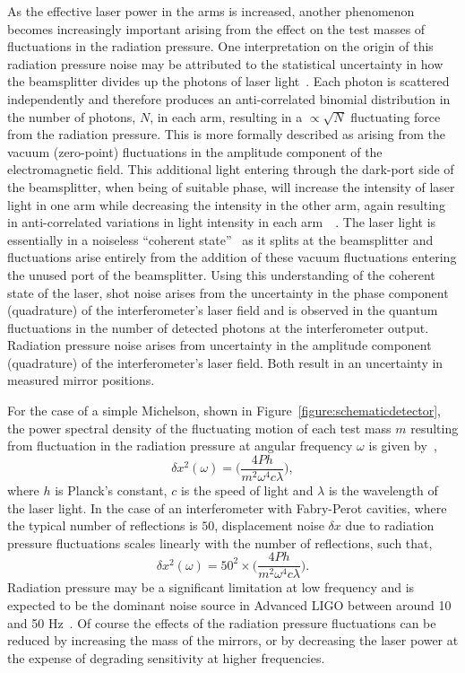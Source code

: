 \documentclass{article}
\begin{document}
As the effective laser power in the arms is increased, another phenomenon
becomes increasingly important arising from the effect on the test masses of
fluctuations in the radiation pressure. One interpretation on the origin of this
radiation pressure noise may be attributed to the statistical uncertainty in how
the beamsplitter divides up the photons of laser light~\cite{Edelstein}. Each
photon is scattered independently and therefore produces an anti-correlated
binomial distribution in the number of photons, $N$, in each arm, resulting in a
$\propto\sqrt{N}$ fluctuating force from the radiation pressure. This is more
formally described as arising from the vacuum (zero-point) fluctuations in the
amplitude component of the electromagnetic field. This additional light entering
through the dark-port side of the beamsplitter, when being of suitable phase,
will increase the intensity of laser light in one arm while decreasing the
intensity in the other arm, again resulting in anti-correlated variations in
light intensity in each arm~\cite{Caves1}~\cite{Caves2}. The laser light is
essentially in a noiseless ``coherent state''~\cite{Glauber:1963} as it splits
at the beamsplitter and fluctuations arise entirely from the addition
of these vacuum fluctuations entering the unused port of the beamsplitter. Using
this understanding of the coherent state of the laser, shot noise arises from
the uncertainty in the phase component (quadrature) of the interferometer's
laser field and is observed in the quantum fluctuations in the number of
detected photons at the interferometer output. Radiation pressure noise arises
from uncertainty in the amplitude component (quadrature) of the interferometer's
laser field. Both result in an uncertainty in measured mirror positions.

For the case of a simple Michelson, shown in
Figure~\ref{figure:schematicdetector}, the power spectral density of the
fluctuating motion of each test mass $m$ resulting from fluctuation in the
radiation pressure at angular frequency $\omega$ is given by~\cite{Edelstein},
\begin{equation}
\delta x^2(\omega) = \biggl(\frac{4 P h}{m^2 \omega^4 c
\lambda}\biggr),
 \label{equ:radiation-pressure1}
\end{equation}
where $h$ is Planck's constant, $c$ is the speed of light and $\lambda$ is the
wavelength of the laser light. In the case of an interferometer with Fabry-Perot
cavities, where the typical number of reflections is $50$, displacement noise
$\delta x$ due to radiation pressure fluctuations scales linearly with the
number of reflections, such that,
\begin{equation}
\delta x^2(\omega) = 50^2 \times \biggl(\frac{4 P h}{m^2 \omega^4
c \lambda}\biggr).
 \label{equ:radiation-pressure2}
\end{equation}
Radiation pressure may be a significant limitation at low frequency and is
expected to be the dominant noise source in Advanced LIGO between around 10 and
50 Hz~\cite{Harry:2010}. Of course the effects of the radiation pressure
fluctuations can be reduced by increasing the mass of the mirrors, or by
decreasing the laser power at the expense of degrading sensitivity at higher
frequencies.
\end{document}
